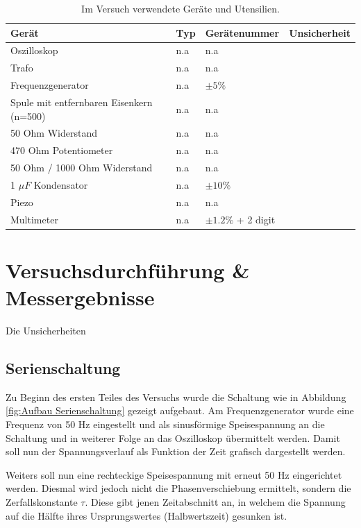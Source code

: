 \documentclass[12pt,a4paper,twoside]{article}
\begin{document}
    \begin{table}[H]
        \centering
        \caption{Im Versuch verwendete Geräte und Utensilien.}
        \label{tab:geraete}
        \begin{tabular}{| l | l | l | l |}
            \hline
            Gerät   & Typ   & Gerätenummer  & Unsicherheit \\
            \hline
            Oszilloskop & {n.a} & {n.a} \\
            Trafo & {n.a} & {n.a} \\
            Frequenzgenerator & {n.a} & $\pm 5\%$ \\
            Spule mit entfernbaren Eisenkern (n=500) & {n.a} & {n.a} \\
            50 Ohm Widerstand & {n.a} & {n.a} \\
            470 Ohm Potentiometer & {n.a} & {n.a} \\
            50 Ohm / 1000 Ohm Widerstand & {n.a} & {n.a} \\
            1 $\mu F$ Kondensator& {n.a} & $\pm 10\%$ \\
            Piezo & {n.a} & {n.a} \\
            Multimeter & {n.a} & $\pm 1.2\%$ + 2 digit \\
            \hline
        \end{tabular}
    \end{table}


\section{Versuchsdurchführung \& Messergebnisse} %

Die Unsicherheiten

\subsection{Serienschaltung}

Zu Beginn des ersten Teiles des Versuchs wurde die Schaltung wie in Abbildung \ref{fig:Aufbau Serienschaltung} gezeigt aufgebaut. 
Am Frequenzgenerator wurde eine Frequenz von 50 Hz eingestellt und als sinusförmige Speisespannung an die Schaltung und in weiterer Folge an das Oszilloskop übermittelt werden. Damit soll nun der Spannungsverlauf als Funktion der Zeit grafisch dargestellt werden. \newline

\noindent
Weiters soll nun eine rechteckige Speisespannung mit erneut 50 Hz eingerichtet werden. Diesmal wird jedoch nicht die Phasenverschiebung ermittelt, sondern die Zerfallskonstante $\tau$.
Diese gibt jenen Zeitabschnitt an, in welchem die Spannung auf die Hälfte ihres Ursprungswertes (Halbwertszeit) gesunken ist. \newline
\end{document}
